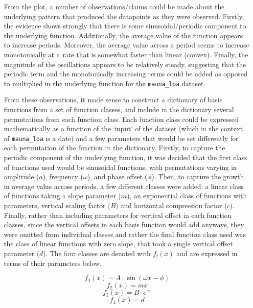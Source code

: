 \documentclass{article}
\begin{document}

From the plot, a number of observations/claims could be made about the underlying pattern that produced the datapoints as they were observed. Firstly, the evidence shows strongly that there is some sinusoidal/periodic component to the underlying function. Additionally, the average value of the function appears to increase periods. Moreover, the average value across a period seems to increase monotonically at a rate that is somewhat faster than linear (convex). Finally, the magnitude of the oscillations appears to be relatively steady, suggesting that the periodic term and the monotonically increasing terms could be added as opposed to multiplied in the underlying function for the \verb+mauna_loa+ dataset.

From these observations, it made sense to construct a dictionary of basis functions from a set of function classes, and include in the dictionary several permutations from each function class. Each function class could be expressed mathematically as a function of the `input' of the dataset (which in the context of \verb+mauna_loa+ is a date) and a few parameters that would be set differently for each permutation of the function in the dictionary. Firstly, to capture the periodic component of the underlying function, it was decided that the first class of functions used would be sinusoidal functions, with permutations varying in amplitude ($a$), frequency ($\omega$), and phase offset ($\phi$). Then, to capture the growth in average value across periods, a few different classes were added: a linear class of functions taking a slope parameter ($m$), an exponential class of functions with parameters, vertical scaling factor ($B$) and horizontal compression factor ($c$).
Finally, rather than including parameters for vertical offset in each function classes, since the vertical offsets in each basis function would add anyways, they were omitted from individual classes and rather the final function class used was the class of linear functions with zero slope, that took a single vertical offset parameter ($d$). The four classes are denoted with $f_i(x)$ and are expressed in terms of their parameters below.

\begin{equation}
f_1(x) = A \cdot \sin(\omega x - \phi)
\end{equation}
\begin{equation}
f_2(x) = m x
\end{equation}
\begin{equation}
f_3(x) = B \cdot e^{cx}
\end{equation}
\begin{equation}
f_4(x) = d
\end{equation}
\end{document}
